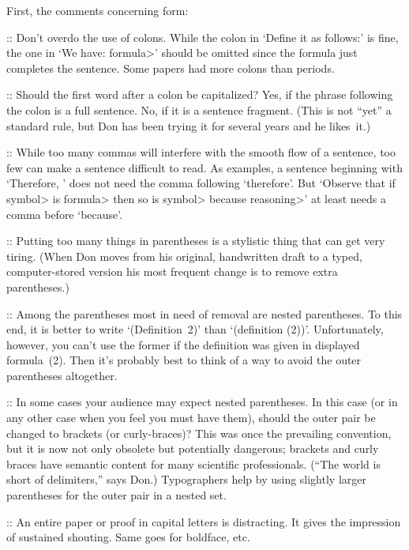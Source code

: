First, the comments concerning form:

\smallskip
\disleft 30pt::
    Don't overdo the use of colons.  While the colon in  `Define it as 
    follows:' is fine, the one in  `We have: \<formula>' should be
    omitted since the formula just completes the sentence.
Some papers had more colons than periods.
    
\smallskip
\disleft 30pt::
    Should the first word after a colon be capitalized? Yes, if the phrase
    following the colon is a full sentence. No, if it is a sentence fragment.
(This is not ``yet'' a standard rule, but Don has been trying it for several
years and he likes~it.)
    
\smallskip
\disleft 30pt::
    While too many commas will interfere with the smooth flow of a sentence, 
    too few can make a sentence difficult to read.  As examples, a sentence
    beginning with `Therefore, ' does not need the comma following
    `therefore'. But `Observe that if \<symbol> is \<formula> then so
    is \<symbol> because \<reasoning>' at least needs a comma before `because'.
    
\smallskip
\disleft 30pt::
    Putting too many things in parentheses is a stylistic thing that can get
    very tiring. (When Don moves from his original, handwritten draft to a
    typed, computer-stored version his most frequent change is to remove extra
    parentheses.)
    
\smallskip
\disleft 30pt::
    Among the parentheses most in need of removal are nested parentheses. To
    this end, it is better to write `(Definition~2)' than `(definition (2))'.
Unfortunately, however, you can't use the former if the definition was given
in displayed formula~(2). Then it's probably best to think of a way to
avoid the outer parentheses altogether.
    
\smallskip
\disleft 30pt::
    In some cases your audience may expect nested parentheses.  In this case
    (or in any other case 
when you feel you must have them), should the outer pair
    be changed to brackets (or curly-braces)?  This was once the
    prevailing convention, but it is now not only obsolete but potentially 
    dangerous; brackets and curly braces have semantic content
for many scientific professionals.
(``The world is short of delimiters,'' says Don.)  
    Typographers help by using slightly larger parentheses for the outer pair 
    in a nested set.
    
\smallskip
\disleft 30pt::
    An entire paper or proof in capital letters is distracting. It gives the
    impression of sustained shouting. Same goes for boldface, etc.
    
